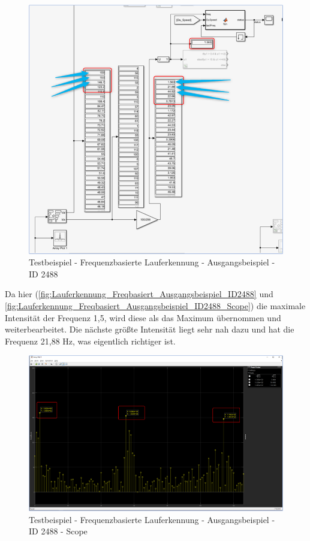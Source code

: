 \begin{figure}[H]
	\centering
	\includegraphics[width=\linewidth]{Bilder/Lauferkennung_Freqbasiert_Ausgangsbeispiel.png}
	\caption{Testbeispiel - Frequenzbasierte Lauferkennung - Ausgangsbeispiel - ID 2488}
	\label{fig:Lauferkennung_Freqbasiert_Ausgangsbeispiel_ID2488}
\end{figure}
Da hier (\autoref{fig:Lauferkennung_Freqbasiert_Ausgangsbeispiel_ID2488} und \autoref{fig:Lauferkennung_Freqbasiert_Ausgangsbeispiel_ID2488_Scope}) die maximale Intensität der Frequenz 1,5, wird diese als das Maximum übernommen und weiterbearbeitet. Die nächste größte Intensität liegt sehr nah dazu und hat die Frequenz 21,88 Hz, was eigentlich richtiger ist.

\begin{figure}[H]
	\centering
	\includegraphics[width=\linewidth]{Bilder/Lauferkennung_Freqbasiert_Ausgangsbeispiel_ID2488_Scope.png}
	\caption{Testbeispiel - Frequenzbasierte Lauferkennung - Ausgangsbeispiel - ID 2488 - Scope}
	\label{fig:Lauferkennung_Freqbasiert_Ausgangsbeispiel_ID2488_Scope}
\end{figure}




